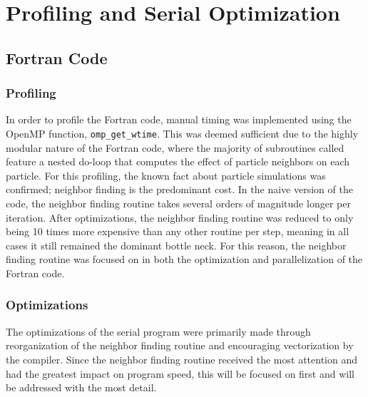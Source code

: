 \documentclass{scrartcl}
\begin{document}
    \section{Profiling and Serial Optimization}
  
  \subsection{Fortran Code}
  \subsubsection{Profiling}
  In order to profile the Fortran code, manual timing was implemented using the OpenMP function, \texttt{omp\_get\_wtime}. This was deemed sufficient due to the highly modular nature of the Fortran code, where the majority of subroutines called feature a nested do-loop that computes the effect of particle neighbors on each particle. For this profiling, the known fact about particle simulations was confirmed; neighbor finding is the predominant cost. In the naive version of the code, the neighbor finding routine takes several orders of magnitude longer per iteration. After optimizations, the neighbor finding routine was reduced to only being 10 times more expensive than any other routine per step, meaning in all cases it still remained the dominant bottle neck. For this reason, the neighbor finding routine was focused on in both the optimization and parallelization of the Fortran code. 
  
  \subsubsection{Optimizations}
  The optimizations of the serial program were primarily made through reorganization of the neighbor finding routine and encouraging vectorization by the compiler. Since the neighbor finding routine received the most attention and had the greatest impact on program speed,  this will be focused on first and will be addressed with the most detail.
  
\end{document}
